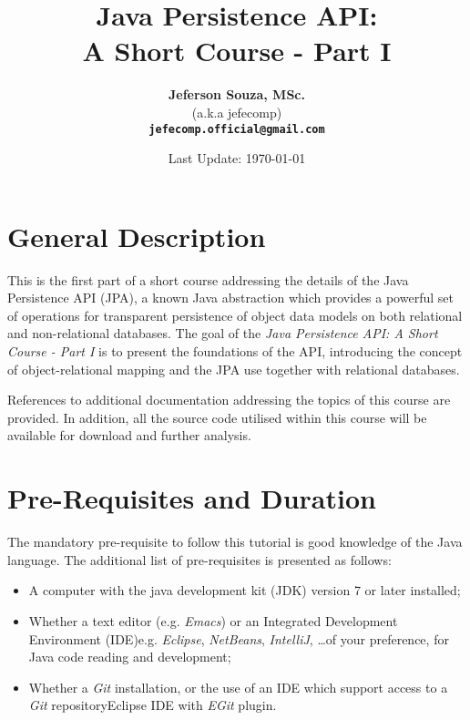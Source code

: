 \documentclass[12pt,a4paper]{article}
\begin{document}
\title{\textbf{Java Persistence API: \\ A Short Course - Part I}}

\author{\textbf{Jeferson Souza, MSc.} \\ 
(a.k.a jefecomp) \\
\textbf{\texttt{jefecomp.official@gmail.com}}}

\date{Last Update: \today}

\maketitle

\section{General Description}

This is the first part of a short course addressing the details of the Java Persistence API (JPA), a known Java abstraction which provides a powerful set of operations for transparent persistence of object data models on both relational and non-relational databases. The goal of the \textit{Java Persistence API: A Short Course - Part I} is to present the foundations of the API, introducing the concept of object-relational mapping and the JPA use together with relational databases.

References to additional documentation addressing the topics of this course are provided. In addition, all the source code utilised within this course will be available for download and further analysis.

\section{Pre-Requisites and Duration}

The mandatory pre-requisite to follow this tutorial is good knowledge of the Java language. The additional list of pre-requisites is presented as follows:

\begin{itemize}
\itemsep 5pt
\item A computer with the java development kit (JDK) version 7 or later installed;

\item Whether a text editor (e.g. \textit{Emacs}) or an Integrated Development Environment (IDE)\textemdash e.g. \textit{Eclipse}, \textit{NetBeans}, \textit{IntelliJ}, \ldots\textemdash of your preference, for Java code reading and development;

\item Whether a \textit{Git} installation, or the use of an IDE which support access to a \textit{Git} repository\textemdash Eclipse IDE with \textit{EGit} plugin.

\end{itemize}
\end{document}
